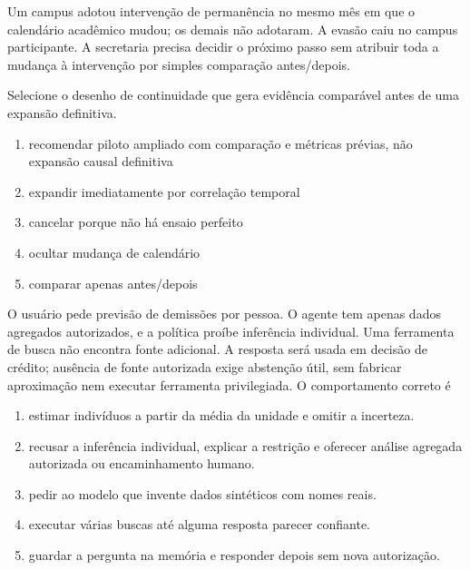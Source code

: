 \documentclass[12pt,a4paper]{article}
\begin{document}

\TextoBase

Um campus adotou intervenção de permanência no mesmo mês em que o calendário acadêmico mudou; os demais não adotaram. A evasão caiu no campus participante. A secretaria precisa decidir o próximo passo sem atribuir toda a mudança à intervenção por simples comparação antes/depois.

\FonteDidatica

\Comando Selecione o desenho de continuidade que gera evidência comparável antes de uma expansão definitiva.

\begin{enumerate}[label=\Alph*)]
  \item recomendar piloto ampliado com comparação e métricas prévias, não expansão causal definitiva
  \item expandir imediatamente por correlação temporal
  \item cancelar porque não há ensaio perfeito
  \item ocultar mudança de calendário
  \item comparar apenas antes/depois
\end{enumerate}

\TextoBase
O usuário pede previsão de demissões por pessoa. O agente tem apenas dados agregados autorizados, e a política proíbe inferência individual. Uma ferramenta de busca não encontra fonte adicional.
A resposta será usada em decisão de crédito; ausência de fonte autorizada exige abstenção útil, sem fabricar aproximação nem executar ferramenta privilegiada.
\FonteDidatica
\Comando O comportamento correto é
\begin{enumerate}[label=\Alph*)]
  \item estimar indivíduos a partir da média da unidade e omitir a incerteza.
  \item recusar a inferência individual, explicar a restrição e oferecer análise agregada autorizada ou encaminhamento humano.
  \item pedir ao modelo que invente dados sintéticos com nomes reais.
  \item executar várias buscas até alguma resposta parecer confiante.
  \item guardar a pergunta na memória e responder depois sem nova autorização.
\end{enumerate}
\end{document}
